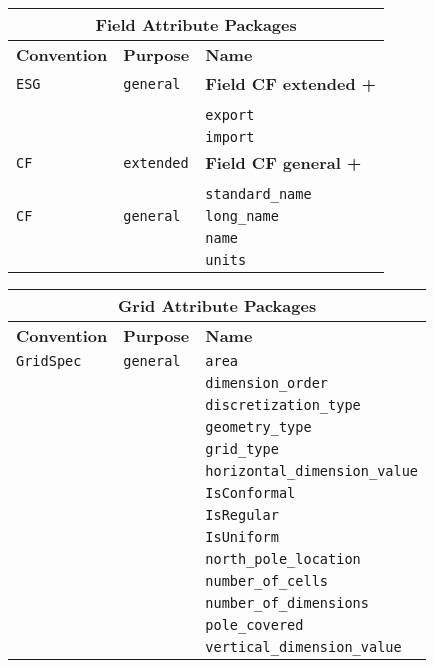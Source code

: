 \vspace{18pt}

\begin{tabular}{|p{4cm}|p{4cm}|p{6cm}|}
\hline
\multicolumn{3}{|c|}{{\bf \large Field Attribute Packages}} \\
\hline\hline
{\bf Convention} & {\bf Purpose} & {\bf Name} \\
\hline\hline
{\tt ESG} & {\tt general} & {\bf Field CF extended +} \\
& & \\
& & {\tt export}  \\
 & & {\tt import} \\ 
\hline
{\tt CF} & {\tt extended} & {\bf Field CF general +} \\
& & \\
& & {\tt standard\_name}\\ 
\hline
{\tt CF} & {\tt general} & {\tt long\_name}\\
     & & {\tt name} \\
     & & {\tt units}  \\
\hline
\end{tabular}
\label{FieldAttributePackages}

\begin{tabular}{|p{4cm}|p{4cm}|p{6cm}|}
\hline
\multicolumn{3}{|c|}{{\bf \large Grid Attribute Packages}} \\
\hline\hline
{\bf Convention} & {\bf Purpose} & {\bf Name} \\
\hline\hline
{\tt GridSpec} & {\tt general} & {\tt area}  \\
 & & {\tt dimension\_order} \\ 
 & & {\tt discretization\_type} \\ 
 & & {\tt geometry\_type} \\ 
 & & {\tt grid\_type} \\ 
 & & {\tt horizontal\_dimension\_value} \\ 
 & & {\tt IsConformal} \\ 
 & & {\tt IsRegular} \\ 
 & & {\tt IsUniform} \\ 
 & & {\tt north\_pole\_location} \\ 
 & & {\tt number\_of\_cells} \\ 
 & & {\tt number\_of\_dimensions} \\ 
 & & {\tt pole\_covered} \\ 
 & & {\tt vertical\_dimension\_value} \\ 
\hline
\end{tabular}
\label{GridAttributePackages}


